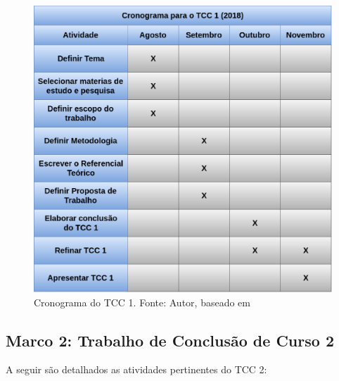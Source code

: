 \begin{figure}[!ht]
	\centering
  \includegraphics[keepaspectratio=true,scale=0.4]{figuras/cronograma_tcc1.eps}
  \caption[Cronograma do TCC 1.]{Cronograma do TCC 1. Fonte: Autor, baseado em \cite{leonardo}}
	\label{fig:cronograma_tcc1}
\end{figure}

\subsection{Marco 2: Trabalho de Conclusão de Curso 2}

A seguir são detalhados as atividades pertinentes do TCC 2:

